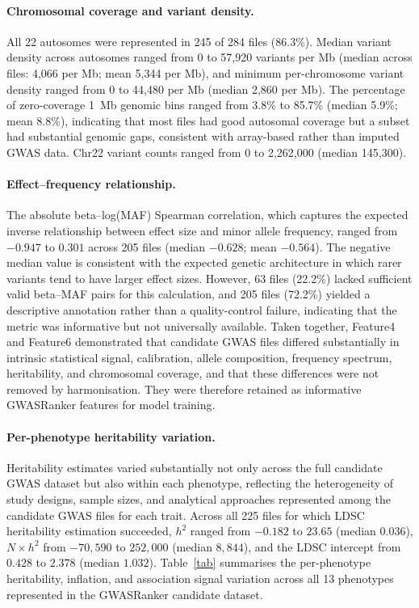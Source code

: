 \documentclass[11pt,a4paper]{article}
\begin{document}
\paragraph{Chromosomal coverage and variant density.}All 22 autosomes were represented in 245 of 284 files (86.3\%). Median variant density across autosomes ranged from 0 to 57,920 variants per Mb (median across files: 4,066 per Mb; mean 5,344 per Mb), and minimum per-chromosome variant density ranged from 0 to 44,480 per Mb (median 2,860 per Mb). The percentage of zero-coverage 1~Mb genomic bins ranged from 3.8\% to 85.7\% (median 5.9\%; mean 8.8\%), indicating that most files had good autosomal coverage but a subset had substantial genomic gaps, consistent with array-based rather than imputed GWAS data. Chr22 variant counts ranged from 0 to 2,262,000 (median 145,300).

\paragraph{Effect--frequency relationship.}The absolute beta--log(MAF) Spearman correlation, which captures the expected inverse relationship between effect size and minor allele frequency, ranged from $-0.947$ to $0.301$ across 205 files (median $-0.628$; mean $-0.564$). The negative median value is consistent with the expected genetic architecture in which rarer variants tend to have larger effect sizes. However, 63 files (22.2\%) lacked sufficient valid beta--MAF pairs for this calculation, and 205 files (72.2\%) yielded a descriptive annotation rather than a quality-control failure, indicating that the metric was informative but not universally available. Taken together, Feature4 and Feature6 demonstrated that candidate GWAS files differed substantially in intrinsic statistical signal, calibration, allele composition, frequency spectrum, heritability, and chromosomal coverage, and that these differences were not removed by harmonisation. They were therefore retained as informative GWASRanker features for model training.
\paragraph{Per-phenotype heritability variation.}Heritability estimates varied substantially not only across the full candidate GWAS dataset but also within each phenotype, reflecting the heterogeneity of study designs, sample sizes, and analytical approaches represented among the candidate GWAS files for each trait. Across all 225 files for which LDSC heritability estimation succeeded, $h^2$ ranged from $-0.182$ to $23.65$ (median $0.036$), $N \times h^2$ from $-70{,}590$ to $252{,}000$ (median $8{,}844$), and the LDSC intercept from $0.428$ to $2.378$ (median $1.032$). Table~\ref{tab} summarises the per-phenotype heritability, inflation, and association signal variation across all 13 phenotypes represented in the GWASRanker candidate dataset.
\end{document}
